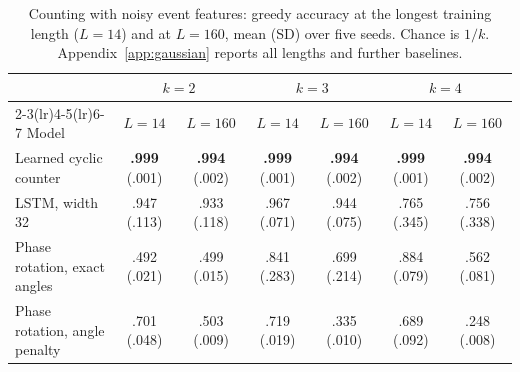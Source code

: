 \begin{table}[!t]
\centering\small
\caption{Counting with noisy event features: greedy accuracy at the longest
training length ($L=14$) and at $L=160$, mean (SD) over five seeds. Chance is
$1/k$. Appendix~\ref{app:gaussian} reports all lengths and further baselines.}
\label{tab:noisy}
\setlength{\tabcolsep}{4pt}
\begin{tabular}{lcccccc}
\toprule
& \multicolumn{2}{c}{$k=2$} & \multicolumn{2}{c}{$k=3$} & \multicolumn{2}{c}{$k=4$} \\
\cmidrule(lr){2-3}\cmidrule(lr){4-5}\cmidrule(lr){6-7}
Model & $L=14$ & $L=160$ & $L=14$ & $L=160$ & $L=14$ & $L=160$ \\
\midrule
Learned cyclic counter & \textbf{.999} (.001) & \textbf{.994} (.002) & \textbf{.999} (.001) & \textbf{.994} (.002) & \textbf{.999} (.001) & \textbf{.994} (.002) \\
LSTM, width 32 & .947 (.113) & .933 (.118) & .967 (.071) & .944 (.075) & .765 (.345) & .756 (.338) \\
Phase rotation, exact angles & .492 (.021) & .499 (.015) & .841 (.283) & .699 (.214) & .884 (.079) & .562 (.081) \\
Phase rotation, angle penalty & .701 (.048) & .503 (.009) & .719 (.019) & .335 (.010) & .689 (.092) & .248 (.008) \\
\bottomrule
\end{tabular}
\end{table}
